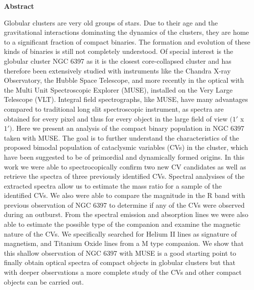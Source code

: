 \thispagestyle{empty}
\begin{Large}
\textbf{Abstract}
\end{Large}
\bigbreak
Globular clusters are very old groups of stars. Due to their age and the gravitational interactions dominating the dynamics of the clusters, they are home to a significant fraction of compact binaries. The formation
and evolution of these kinds of binaries is still not completely understood. Of special interest is the globular cluster NGC 6397 as it is the closest core-collapsed cluster and has therefore been extensively studied
with instruments like the Chandra X-ray Observatory, the Hubble Space Telescope, and more recently in the optical with the Multi Unit Spectroscopic Explorer (MUSE), installed on the Very Large Telescope (VLT). Integral field spectrographs, like MUSE, have many advantages compared to traditional long slit spectroscopic instrument, as spectra are obtained for every pixel and thus for every object in the large field of view $(1'$ x $1')$. Here we present an analysis of the compact binary population in NGC 6397 taken with MUSE. The goal is to further understand the characteristics of the proposed bimodal population of cataclysmic variables (CVs) in the cluster, which have been suggested to be of primordial and dynamically formed origins. In this work we were able to spectrocopically confirm two new CV candidates as well  as retrieve the spectra of three previously identified CVs. Spectral analysises of the extracted spectra allow us to estimate the mass ratio for a sample of the identified CVs. We also were able to compare the magnitude in the R band with previous observation of NGC 6397 to determine if any of the CVs were observed during an outburst.  From the spectral emission and absorption lines we were also able to estimate the possible type of the companion and examine the magnetic nature of the CVs. We specifically searched for Helium II lines as signature of magnetism, and Titanium Oxide lines from a M type companion. We show that this shallow observation of NGC 6397 with MUSE is a good starting point to finally obtain optical spectra of compact objects in globular clusters but that with deeper observations a more complete study of the CVs and other compact objects can be carried out. 
\clearpage

